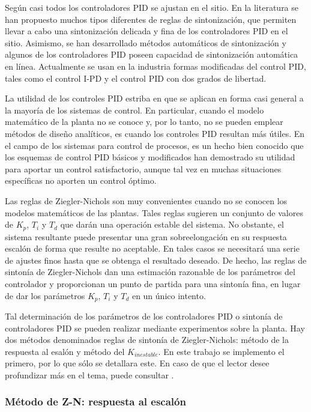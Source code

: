 \documentclass[10pt,conference,a4paper,onecolumn]{article}%
\begin{document}
Según \cite{ogata} casi todos los controladores PID se ajustan en el sitio. En la literatura se han propuesto muchos tipos diferentes de reglas de sintonización, que permiten llevar a cabo una sintonización delicada y fina de los controladores PID en el sitio. Asimismo, se han desarrollado métodos automáticos de sintonización y algunos de los controladores PID poseen capacidad de sintonización automática en línea. Actualmente se usan en la industria formas modificadas del control PID, tales como el control I-PD y el control PID con dos grados de libertad.

La utilidad de los controles PID estriba en que se aplican en forma casi general a la mayoría de los sistemas de control. En particular, cuando el modelo matemático de la planta no se conoce y, por lo tanto, no se pueden emplear métodos de diseño analíticos, es cuando los controles PID resultan más útiles. En el campo de los sistemas para control de procesos, es un hecho bien conocido que los esquemas de control PID básicos y modificados han demostrado su utilidad para aportar un control satisfactorio, aunque tal vez en muchas situaciones específicas no aporten un control óptimo.

Las reglas de Ziegler-Nichols son muy convenientes cuando no se conocen los modelos matemáticos de las plantas. Tales reglas sugieren un conjunto de valores de $K_p$, $T_i$ y $T_d$ que darán una operación estable del sistema. No obstante, el sistema resultante puede presentar una gran sobreelongación en su respuesta escalón de forma que resulte no aceptable. En tales casos se necesitará una serie de ajustes finos hasta que se obtenga el resultado deseado. De hecho, las reglas de sintonía de Ziegler-Nichols dan una estimación razonable de los parámetros del controlador y proporcionan un punto de partida para una sintonía fina, en lugar de dar los parámetros $K_p$, $T_i$ y $T_d$ en un único intento.

Tal determinación de los parámetros de los controladores PID o sintonía de controladores PID se pueden realizar mediante experimentos sobre la planta. Hay dos métodos denominados reglas de sintonía de Ziegler-Nichols: método de la respuesta al esalón y método del $K_{inestable}$. En este trabajo se implemento el primero, por lo que sólo se detallara este. En caso de que el lector desee profundizar más en el tema, puede consultar \cite{biblia_PID} \cite{paginaZN}. 

\subsubsection{Método de Z-N: respuesta al escalón}
\end{document}
